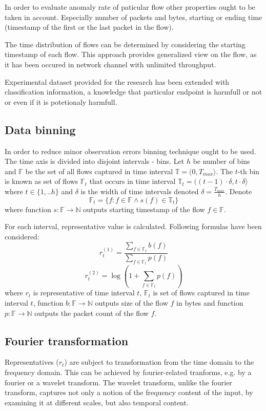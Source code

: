 \documentclass[a4paper]{IEEEtran}
\begin{document}
In order to evaluate anomaly rate of paticular flow other properties ought to be
taken in account. Especially number of packets and bytes, starting or ending time
(timestamp of the first or the last packet in the flow).

The time distribution of flows can be determined by considering the
starting timestamp of each flow. This approach provides generalized view on the flow, 
as it has been occured in network channel with unlimited throughput.

Experimental dataset provided for the research has been extended with
classification information, a knowledge that particular endpoint is 
harmfull or not or even if it is potetionaly harmfull.

\subsection{Data binning}
In order to reduce minor observation errors binning technique ought to be used.
The time axis is divided into disjoint intervals - bins.
Let $h$ be number of bins and $\mathbb{F}$ be the set of all flows captured in time interval
$\mathbb{T} = (0, T_{max}\rangle $. The $t$-th bin is known as 
set of flows $\mathbb{F}_t$ 
that occurs in time interval
$\mathbb{T}_t = ((t-1)\cdot \delta, t\cdot \delta\rangle $ where 
$t \in \{1, .. h\}$ and $\delta$ is the width of time intervals
denoted $\delta = \frac{T_{max}}{h}$.
Denote
\[
\mathbb{F}_t = \{f : f \in \mathbb{F} \wedge s(f) \in \mathbb{T}_t \}
\]
where function $s:\mathbb{F} \rightarrow \mathbb{N} $ 
outputs starting timestamp of the flow $f\in \mathbb{F}$.

For each interval,
representative value is calculated. Following formulas have been considered:
\[
r_t^{(1)} = \frac{\sum\limits_{f\in \mathbb{F}_t}b(f)}{\sum\limits_{f\in \mathbb{F}_t}p(f)}
\]
\[
r_t^{(2)} = \log(1+\sum\limits_{f\in \mathbb{F}_t}p(f))
\]
where $r_t$ is representative of time interval $t$, $\mathbb{F}_t$ is set of flows captured in time 
interval $t$, function $b:\mathbb{F} \rightarrow \mathbb{N}$ outputs size of the flow $f$ in bytes and function 
$p:\mathbb{F} \rightarrow \mathbb{N}$ outputs the packet count of the flow $f$.


\subsection{Fourier transformation}
Representatives ($r_t$) are subject to transformation from the time domain to the
frequency domain.
This can be achieved by fourier-related
tranforms, e.g. by a fourier or a wavelet transform.
The wavelet transform, unlike the fourier transform, captures
not only a notion of the frequency content of the input, by
examining it at different scales, but also temporal content.
\end{document}
